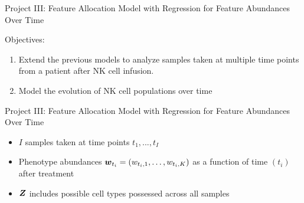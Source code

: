 \documentclass[ignorenonframetext,]{beamer}
\newcommand{\bZ}{\mbox{\boldmath $Z$}}
\newcommand{\bw}{\mbox{\boldmath $w$}}
\begin{document}



\begin{frame}{Project III: Feature Allocation Model with Regression for
Feature Abundances Over Time}
\begin{block}{Objectives:}
\begin{enumerate}
  \setlength\itemsep{1em}
  \item Extend the previous models to analyze samples taken at multiple time points from a patient after NK cell infusion.
  \item Model the evolution of NK cell populations over time
\end{enumerate}
\end{block}
\end{frame}

\begin{frame}{Project III: Feature Allocation Model with Regression for
Feature Abundances Over Time}
\begin{itemize}
  \setlength\itemsep{1em}
  \item $I$ samples taken at time points $t_1,...,t_I$
  \item Phenotype abundances $\bw_{t_i}=(w_{t_i,1}, \ldots, w_{t_i,K})$ as a function of time $(t_i)$ after treatment 
  \item $\bZ$ includes possible cell types possessed across all samples
\end{itemize}
\end{frame}
\end{document}
